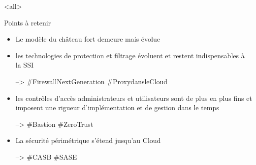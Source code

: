 \mode<all>{\texframe
{Points à retenir} %
{} %
{
\begin{itemize}
    \item Le modèle du château fort demeure mais évolue
    \item les technologies de protection et filtrage évoluent et restent indispensables à la SSI
    
    --> \#FirewallNextGeneration \#ProxydansleCloud
    \item les contrôles d'accès administrateurs et utilisateurs sont de plus en plus fins et imposent une rigueur d'implémentation et de gestion dans le temps
    
     --> \#Bastion \#ZeroTrust
    \item La sécurité périmétrique s'étend jusqu'au Cloud
    
     --> \#CASB \#SASE
\end{itemize}
}}
